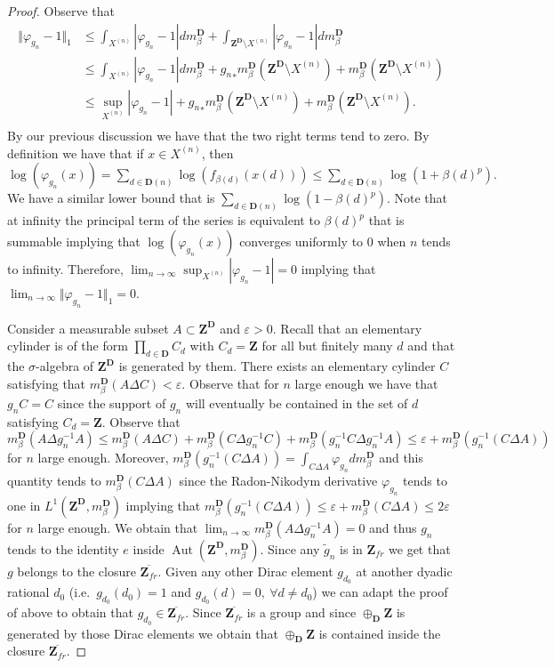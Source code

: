 \documentclass[a4paper,12pt]{amsart}
\numberwithin{equation}{section}
\theoremstyle{definition}
\DeclareMathOperator{\Aut}{Aut}
\newcommand{\D}{\mathbf D}
\newcommand{\mbD}{m_\beta^\D}
\newcommand{\varep}{\varepsilon}
\newcommand{\Z}{\mathbf{Z}}
\begin{document}
\begin{proof}
Observe that 
\begin{align*}
\Vert \varphi_{g_n} - 1 \Vert_1 & \leq \int_{X^{(n)}} |\varphi_{g_n} - 1| dm_\beta^\D + \int_{\Z^\D\setminus X^{(n)} } |\varphi_{g_n} - 1| dm_\beta^\D \\
& \leq \int_{X^{(n)}} |\varphi_{g_n} - 1| dm_\beta^\D  + {g_n}_* m_\beta^\D(\Z^\D\setminus X^{(n)}) + m_\beta^\D(\Z^\D\setminus X^{(n)}) \\
& \leq \sup_{ X^{ ( n ) } } |\varphi_{g_n} - 1|  + {g_n}_* m_\beta^\D(\Z^\D\setminus X^{(n)}) + m_\beta^\D(\Z^\D\setminus X^{(n)}). \\
\end{align*}
By our previous discussion we have that the two right terms tend to zero.
By definition we have that if $x\in X^{(n)}$, then 
$\log(\varphi_{g_n}(x)) = \sum_{d\in\D(n)} \log(f_{\beta(d)}(x(d))) \leq  \sum_{d\in\D(n)} \log( 1 + \beta(d)^p).$
We have a similar lower bound that is $\sum_{d\in\D(n)} \log( 1 - \beta(d)^p)$.
Note that at infinity the principal term of the series is equivalent to $\beta(d)^p$ that is summable implying that $\log(\varphi_{g_n}(x))$ converges uniformly to $0$ when $n$ tends to infinity.
Therefore, $\lim_{n\to\infty} \sup_{ X^{ ( n ) } } |\varphi_{g_n} - 1| =0$ implying that $\lim_{n\to\infty}\Vert \varphi_{g_n} - 1 \Vert_1=0.$

Consider a measurable subset $A\subset \Z^\D$ and $\varep>0.$
Recall that an elementary cylinder is of the form $\prod_{d\in\D} C_d$ with $C_d=\Z$ for all but finitely many $d$ and that the $\sigma$-algebra of $\Z^\D$ is generated by them.
There exists an elementary cylinder $C$ satisfying that $\mbD(A\Delta C)<\varep.$
Observe that for $n$ large enough we have that $g_nC=C$ since the support of $g_n$ will eventually be contained in the set of $d$ satisfying $C_d=\Z$.
Observe that 
$$\mbD(A\Delta g_n^{-1}A)\leq \mbD(A\Delta C)+\mbD(C\Delta g_n^{-1}C)+\mbD(g^{-1}_nC\Delta g_n^{-1}A)\leq \varep + \mbD(g^{-1}_n(C\Delta A))$$
for $n$ large enough.
Moreover, $\mbD(g^{-1}_n(C\Delta A)) = \int_{C\Delta A} \varphi_{g_n} d \mbD$ and this quantity tends to $\mbD(C\Delta A)$ since the Radon-Nikodym derivative $\varphi_{g_n}$ tends to one in $L^1(\Z^\D,\mbD)$ implying that $\mbD(g^{-1}_n(C\Delta A))\leq \varep+\mbD(C\Delta A)\leq 2\varep$ for $n$ large enough.
We obtain that $\lim_{n\to\infty} \mbD(A\Delta g_n^{-1}A)=0$ and thus $g_n$ tends to the identity $e$ inside $\Aut(\Z^\D, \mbD)$.
Since any $\tilde g_n$ is in $\Z_{fr}$ we get that $g$ belongs to the closure $\overline{\Z_{fr}}.$
Given any other Dirac element $g_{d_0}$ at another dyadic rational $d_0$ (i.e.~$g_{d_0}(d_0)=1$ and $g_{d_0}(d)=0,\ \forall d\neq d_0$) we can adapt the proof of above to obtain that $g_{d_0}\in\overline{\Z_{fr}}.$
Since $\overline{\Z_{fr}}$ is a group and since $\oplus_\D\Z$ is generated by those Dirac elements we obtain that $\oplus_\D\Z$ is contained inside the closure $\overline{\Z_{fr}}$.
\end{proof}
\end{document}
